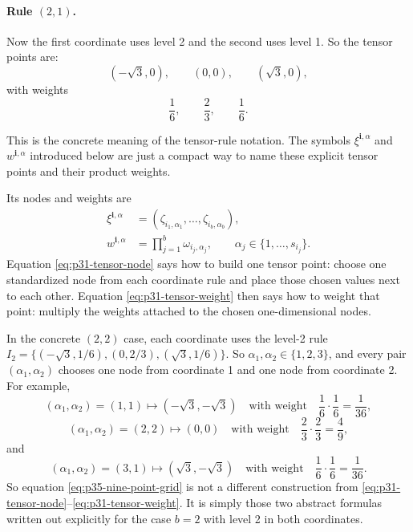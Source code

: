 \documentclass[11pt]{article}
\numberwithin{equation}{section}
\begin{document}
\paragraph{Rule \texorpdfstring{\((2,1)\)}{(2,1)}.}
Now the first coordinate uses level 2 and the second uses level 1.  So the
tensor points are:
\begin{equation}
  (-\sqrt3,0),\qquad (0,0),\qquad (\sqrt3,0),
  \label{eq:p36-rule-21-points}
\end{equation}
with weights
\begin{equation}
  \frac16,\qquad \frac23,\qquad \frac16.
  \label{eq:p36-rule-21-weights}
\end{equation}

This is the concrete meaning of the tensor-rule notation.  The symbols
\(\xi^{\mathbf i,\alpha}\) and \(w^{\mathbf i,\alpha}\) introduced below are just
a compact way to name these explicit tensor points and their product weights.

Its nodes and weights are
\begin{align}
  \xi^{\mathbf i,\alpha}
  &=
  (\zeta_{i_1,\alpha_1},\ldots,\zeta_{i_b,\alpha_b}),
  \label{eq:p31-tensor-node}\\
  w^{\mathbf i,\alpha}
  &=
  \prod_{j=1}^b\omega_{i_j,\alpha_j},
  \qquad
  \alpha_j\in\{1,\ldots,s_{i_j}\}.
  \label{eq:p31-tensor-weight}
\end{align}
Equation \eqref{eq:p31-tensor-node} says how to build one tensor point: choose one
standardized node from each coordinate rule and place those chosen values next to
each other.  Equation \eqref{eq:p31-tensor-weight} then says how to weight that
point: multiply the weights attached to the chosen one-dimensional nodes.

In the concrete \((2,2)\) case, each coordinate uses the level-2 rule
\(I_2=\{(-\sqrt3,1/6),(0,2/3),(\sqrt3,1/6)\}\).  So
\(\alpha_1,\alpha_2\in\{1,2,3\}\), and every pair
\((\alpha_1,\alpha_2)\) chooses one node from coordinate 1 and one node from
coordinate 2.  For example,
\[
  (\alpha_1,\alpha_2)=(1,1)
  \mapsto
  (-\sqrt3,-\sqrt3)
  \quad\text{with weight}\quad
  \frac16\cdot\frac16=\frac1{36},
\]
\[
  (\alpha_1,\alpha_2)=(2,2)
  \mapsto
  (0,0)
  \quad\text{with weight}\quad
  \frac23\cdot\frac23=\frac49,
\]
and
\[
  (\alpha_1,\alpha_2)=(3,1)
  \mapsto
  (\sqrt3,-\sqrt3)
  \quad\text{with weight}\quad
  \frac16\cdot\frac16=\frac1{36}.
\]
So equation \eqref{eq:p35-nine-point-grid} is not a different construction from
\eqref{eq:p31-tensor-node}--\eqref{eq:p31-tensor-weight}.  It is simply those two
abstract formulas written out explicitly for the case \(b=2\) with level 2 in
both coordinates.
\end{document}
